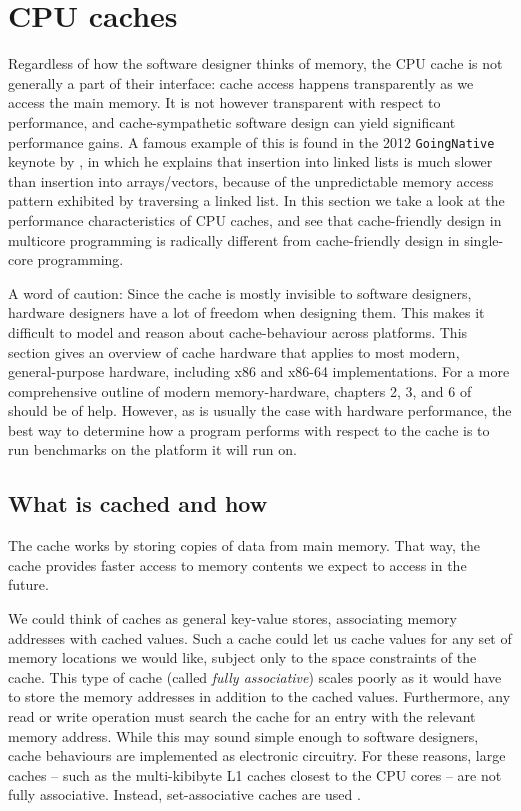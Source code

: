 \section{CPU caches}
\label{sec:caches}
Regardless of how the software designer thinks of memory, the CPU cache is not
generally a part of their interface: cache access happens transparently as we
access the main memory. It is not however transparent with
respect to performance, and cache-sympathetic software design can yield
significant performance gains. A famous example of this is found in the 2012
\texttt{GoingNative} keynote by \citeauthor{stroustrup} \cite{stroustrup}, in
which he explains that insertion into linked lists is much slower than
insertion into arrays/vectors, because of the unpredictable memory access
pattern exhibited by traversing a linked list. In this section we take a look
at the performance characteristics of CPU caches, and see that cache-friendly
design in multicore programming is radically different from cache-friendly
design in single-core programming.

A word of caution:
Since the cache is mostly invisible to software designers, hardware designers
have a lot of freedom when designing them. This makes it difficult to model and
reason about cache-behaviour across platforms. This section gives an overview
of cache hardware that applies to most modern, general-purpose hardware,
including x86 and x86-64 implementations. For a more comprehensive outline of
modern memory-hardware, chapters 2, 3, and 6 of
\cite{whatprogrammersshouldknow} should be of help. However, as is usually the
case with hardware performance, the best way to determine how a program
performs with respect to the cache is to run benchmarks on the platform
it will run on.

\subsection{What is cached and how} The cache works by storing copies
of data from main memory. That way, the cache provides faster access to
memory contents we expect to access in the future.

We could think of caches as general key-value stores, associating memory
addresses with cached values. Such a cache could let us cache values for any
set of memory locations we would like, subject only to the space constraints of
the cache. This type of cache (called \textit{fully associative}) scales
poorly as it would have to store the memory addresses in addition to the cached
values. Furthermore, any read or write operation must search the cache for an
entry with the relevant memory address. While this may sound simple enough to
software designers, cache behaviours are implemented as electronic circuitry.
For these reasons, large caches -- such as the multi-kibibyte L1 caches closest
to the CPU cores -- are not fully associative. Instead, set-associative caches
are used \cite{whatprogrammersshouldknow} \cite{mckenny-barriers}.

